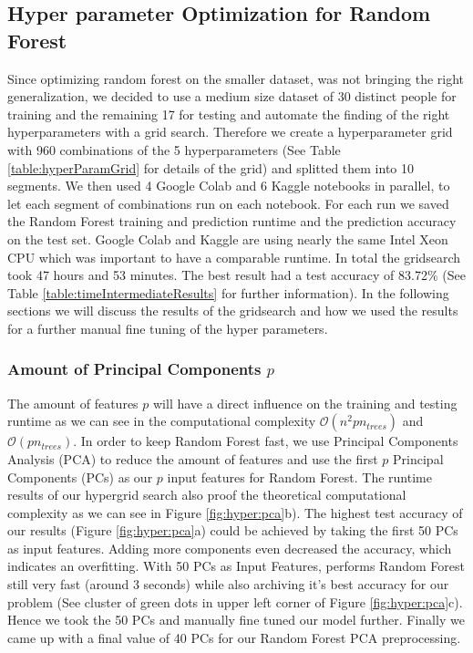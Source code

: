 \documentclass[conference]{IEEEtran}
\begin{document}
\subsection{Hyper parameter Optimization for Random Forest}\label{sec:hyper:rf}
\textcolor{til}{
    Since optimizing random forest on the smaller dataset, was not bringing the right generalization, we decided to use a medium size dataset of 30 distinct people for training and the remaining 17 for testing and automate the finding of the right hyperparameters with a grid search. Therefore we create a hyperparameter grid with 960 combinations of the 5 hyperparameters (See Table \ref{table:hyperParamGrid} for details of the grid) and splitted them into 10 segments. We then used 4 Google Colab and 6 Kaggle notebooks in parallel, to let each segment of combinations run on each notebook. For each run we saved the Random Forest training and prediction runtime and the prediction accuracy on the test set. Google Colab and Kaggle are using nearly the same Intel Xeon CPU which was important to have a comparable runtime. In total the gridsearch took 47 hours and 53 minutes. The best result had a test accuracy of 83.72\% (See Table \ref{table:timeIntermediateResults} for further information). In the following sections we will discuss the results of the gridsearch and how we used the results for a further manual fine tuning of the hyper parameters. 
    \subsubsection{Amount of Principal Components $p$}
    The amount of features $p$ will have a direct influence on the training and testing runtime as we can see in the computational complexity $\mathcal{O}(n^2pn_{trees})$ and $\mathcal{O}(pn_{trees})$. In order to keep Random Forest fast, we use Principal Components Analysis (PCA) to reduce the amount of features and use the first $p$ Principal Components (PCs) as our $p$ input features for Random Forest. The runtime results of our hypergrid search also proof the theoretical computational complexity as we can see in Figure \ref{fig:hyper:pca}b). The highest test accuracy of our results (Figure \ref{fig:hyper:pca}a) could be achieved by taking the first 50 PCs as input features. Adding more components even decreased the accuracy, which indicates an overfitting. With 50 PCs as Input Features, performs Random Forest still very fast (around 3 seconds) while also archiving it's best accuracy for our problem (See cluster of green dots in upper left corner of Figure \ref{fig:hyper:pca}c). Hence we took the 50 PCs and manually fine tuned our model further. Finally we came up with a final value of 40 PCs for our Random Forest PCA preprocessing.
}
\end{document}
